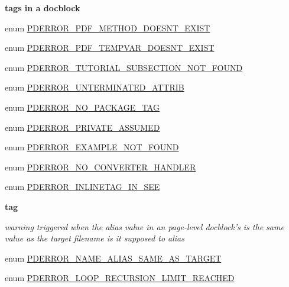 \begin{Indent}{\bf tags in a docblock}
\begin{DoxyCompactItemize}
enum \hyperlink{_errors_8inc_a32fddf1bfab0b283beb6d44003fb5a94}{\-P\-D\-E\-R\-R\-O\-R\-\_\-\-P\-D\-F\-\_\-\-M\-E\-T\-H\-O\-D\-\_\-\-D\-O\-E\-S\-N\-T\-\_\-\-E\-X\-I\-S\-T} 
\item 
enum \hyperlink{_errors_8inc_a1b9e5b7684777580c471be7887162423}{\-P\-D\-E\-R\-R\-O\-R\-\_\-\-P\-D\-F\-\_\-\-T\-E\-M\-P\-V\-A\-R\-\_\-\-D\-O\-E\-S\-N\-T\-\_\-\-E\-X\-I\-S\-T} 
\item 
enum \hyperlink{_errors_8inc_a982f4da3034cc78c02c12309cde3a5b6}{\-P\-D\-E\-R\-R\-O\-R\-\_\-\-T\-U\-T\-O\-R\-I\-A\-L\-\_\-\-S\-U\-B\-S\-E\-C\-T\-I\-O\-N\-\_\-\-N\-O\-T\-\_\-\-F\-O\-U\-N\-D} 
\item 
enum \hyperlink{_errors_8inc_ad6314de1f637c55d46fa2a6a49e9a568}{\-P\-D\-E\-R\-R\-O\-R\-\_\-\-U\-N\-T\-E\-R\-M\-I\-N\-A\-T\-E\-D\-\_\-\-A\-T\-T\-R\-I\-B} 
\item 
enum \hyperlink{_errors_8inc_aabbfef56e9c0b151d72b46a55c511a05}{\-P\-D\-E\-R\-R\-O\-R\-\_\-\-N\-O\-\_\-\-P\-A\-C\-K\-A\-G\-E\-\_\-\-T\-A\-G} 
\item 
enum \hyperlink{_errors_8inc_a698a51197c0fd874d645fc4ddf3a7f84}{\-P\-D\-E\-R\-R\-O\-R\-\_\-\-P\-R\-I\-V\-A\-T\-E\-\_\-\-A\-S\-S\-U\-M\-E\-D} 
\item 
enum \hyperlink{_errors_8inc_a5b9b36a1cecac302cbff07c08c5b4187}{\-P\-D\-E\-R\-R\-O\-R\-\_\-\-E\-X\-A\-M\-P\-L\-E\-\_\-\-N\-O\-T\-\_\-\-F\-O\-U\-N\-D} 
\item 
enum \hyperlink{_errors_8inc_a96e3988884797ef7d3986c332727ba37}{\-P\-D\-E\-R\-R\-O\-R\-\_\-\-N\-O\-\_\-\-C\-O\-N\-V\-E\-R\-T\-E\-R\-\_\-\-H\-A\-N\-D\-L\-E\-R} 
\item 
enum \hyperlink{_errors_8inc_a5ff650df2c89662dadd8591c2a2da23d}{\-P\-D\-E\-R\-R\-O\-R\-\_\-\-I\-N\-L\-I\-N\-E\-T\-A\-G\-\_\-\-I\-N\-\_\-\-S\-E\-E} 
\end{DoxyCompactItemize}
\end{Indent}
\begin{Indent}{\bf tag}\par
{\em warning triggered when the alias value in an page-\/level docblock's is the same value as the target filename is it supposed to alias }\begin{DoxyCompactItemize}
\item 
enum \hyperlink{_errors_8inc_a51ff56392736399adaa50133a9b87737}{\-P\-D\-E\-R\-R\-O\-R\-\_\-\-N\-A\-M\-E\-\_\-\-A\-L\-I\-A\-S\-\_\-\-S\-A\-M\-E\-\_\-\-A\-S\-\_\-\-T\-A\-R\-G\-E\-T} 
\item 
enum \hyperlink{_errors_8inc_a91f11a4dd48d5cd37614a6ab44f174a2}{\-P\-D\-E\-R\-R\-O\-R\-\_\-\-L\-O\-O\-P\-\_\-\-R\-E\-C\-U\-R\-S\-I\-O\-N\-\_\-\-L\-I\-M\-I\-T\-\_\-\-R\-E\-A\-C\-H\-E\-D} 
\end{DoxyCompactItemize}
\end{Indent}
